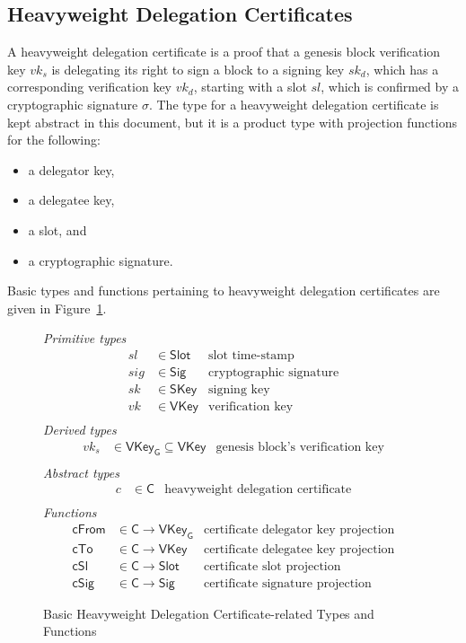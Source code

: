\documentclass[11pt,a4paper]{article}
\newcommand{\fun}[1]{\mathsf{#1}}
\newcommand{\type}[1]{\mathsf{#1}}
\newcommand{\Slot}{\type{Slot}}
\newcommand{\HCert}{\type{C}}
\newcommand{\SKey}{\type{SKey}}
\newcommand{\VKey}{\type{VKey}}
\newcommand{\VKeyGen}{\type{VKey_G}}
\newcommand{\Sig}{\type{Sig}}
\newcommand{\totalf}{\to}
\begin{document}
\subsection{Heavyweight Delegation Certificates}
\label{sec:certificates}

A heavyweight delegation certificate is a proof that a genesis block
verification key $vk_s$ is delegating its right to sign a block to a signing
key $sk_d$, which has a corresponding verification key $vk_d$, starting with a
slot $sl$, which is confirmed by a cryptographic signature $\sigma$.
%
The type for a heavyweight delegation certificate is kept abstract in this
document, but it is a product type with projection functions for the
following:
%
\begin{itemize}
\item a delegator key,
\item a delegatee key,
\item a slot, and
\item a cryptographic signature.
\end{itemize}

Basic types and functions pertaining to heavyweight delegation certificates
are given in Figure~\ref{fig:cert-defs}.

\begin{figure}
  \emph{Primitive types}
  \begin{align*}
    sl & \in \Slot    & \text{slot time-stamp}\\
   sig & \in \Sig     & \text{cryptographic signature}\\
    sk & \in \SKey    & \text{signing key}\\
    vk & \in \VKey    & \text{verification key}\\
  \end{align*}
  \emph{Derived types}
  \begin{align*}
    vk_s & \in \VKeyGen \subseteq \VKey & \text{genesis block's verification key}\\
  \end{align*}
  \emph{Abstract types}
  \begin{align*}
    c & \in \HCert  & \text{heavyweight delegation certificate} \\
  \end{align*}
  \emph{Functions}
  \begin{align*}
    \fun{cFrom} & \in \HCert \totalf \VKeyGen & \text{certificate delegator key projection} \\
    \fun{cTo} & \in \HCert \totalf \VKey & \text{certificate delegatee key projection} \\
    \fun{cSl} & \in \HCert \totalf \Slot & \text{certificate slot projection} \\
    \fun{cSig} & \in \HCert \totalf \Sig & \text{certificate signature projection}
  \end{align*}
  \caption{Basic Heavyweight Delegation Certificate-related Types and Functions}
  \label{fig:cert-defs}
\end{figure}
\end{document}
